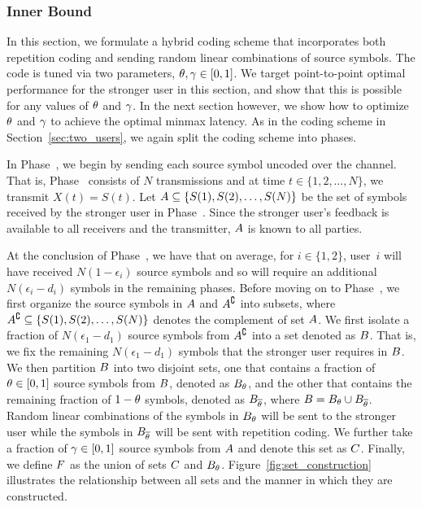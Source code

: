 \subsubsection{Inner Bound}
\label{subsubsec:inner_bound}

In this section, we formulate a hybrid coding scheme that incorporates both repetition coding and sending random linear combinations of source symbols.  The code is tuned via two parameters, $\theta, \gamma \in [0, 1]$.  We target point-to-point optimal performance for the stronger user in this section, and show that this is possible for any values of $\theta$ and $\gamma$.  In the next section however, we show how to optimize $\theta$ and $\gamma$ to achieve the optimal minmax latency.  As in the coding scheme in Section~\ref{sec:two_users}, we again split the coding scheme into phases.  

In Phase~, we begin by sending each source symbol uncoded over the channel.  That is, Phase~ consists of $N$ transmissions and at time $t \in \{1, 2, \ldots, N\}$, we transmit $X(t) = S(t)$.  Let $A \subseteq \{S(1), S(2), \ldots, S(N)\}$ be the set of symbols received by the stronger user in Phase~.  Since the stronger user's feedback is available to all receivers and the transmitter, $A$ is known to all parties.  

At the conclusion of Phase~, we have that on average, for $i \in \{1, 2\}$, user~$i$ will have received $N(1 - \epsilon_i)$ source symbols and so will require an additional $N(\epsilon_i - d_i)$ symbols in the remaining phases.   Before moving on to Phase~, we first organize the source symbols in $A$ and $A^{\complement}$ into subsets, where $A^{\complement} \subseteq \{S(1), S(2), \ldots, S(N)\}$ denotes the complement of set $A$. We first isolate a fraction of $N(\epsilon_1 - d_1)$ source symbols from $A^{\complement}$ into a set denoted as $B$.  That is, we fix the remaining $N(\epsilon_1 - d_1)$ symbols that the stronger user requires in $B$.  We then partition $B$ into two disjoint sets, one that contains a fraction of $\theta \in [0, 1]$ source symbols from $B$, denoted as $B_{\theta}$, and the other that contains the remaining fraction of $1 - \theta$ symbols, denoted as $B_{\overline{\theta}}$, where $B = B_{\theta} \cup B_{\overline{\theta}}$.  Random linear combinations of the symbols in $B_{\theta}$ will be sent to the stronger user while the symbols in $B_{\overline{\theta}}$ will be sent with repetition coding.  We further take a fraction of $\gamma \in [0, 1]$ source symbols from $A$ and denote this set as $C$.  Finally, we define $F$ as the union of sets $C$ and $B_{\theta}$.  Figure~\ref{fig:set_construction} illustrates the relationship between all sets and the manner in which they are constructed.

